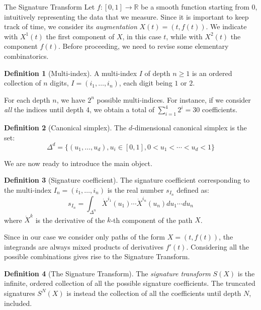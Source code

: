 \documentclass[twocolumn,9pt]{article}
\theoremstyle{definition}
\newtheorem{definition}{Definition}[section]
\theoremstyle{remark}
\begin{document}
\begin{section}{The Signature Transform}
Let $f: [0, 1] \to \mathbb{R}$ be a smooth function starting from $0$,
intuitively representing the data that we measure.
Since it is important to keep track of time, we consider its
\emph{augmentation} $X(t) = (t, f(t))$.
We indicate with $X^1(t)$ the first component of $X$, in this case
$t$, while with $X^2(t)$ the component $f(t)$.
Before proceeding, we need to revise some elementary combinatorics.

\begin{definition}[Multi-index]
A multi-index $I$ of depth $n \geq 1$ is an ordered collection of $n$ digits,
$I = (i_1, \dots, i_n)$, each digit being $1$ or $2$.
\end{definition}
For each depth $n$, we have $2^n$ possible multi-indices.
For instance, if we consider \emph{all} the indices until depth 4,
we obtain a total of $\sum_{i=1}^4 2^i = 30$ coefficients.

\begin{definition}[Canonical simplex]
The $d$-dimensional canonical simplex is the set:
\begin{equation*}
\Delta^d = \{ (u_1, \dots, u_d), u_i \in [0,1] ,
            0 < u_1 < \cdots < u_d < 1 \}
\end{equation*}
\end{definition}

We are now ready to introduce the main object.
\begin{definition}[Signature coefficient]
The signature coefficient corresponding to the multi-index
$I_n = (i_1, \dots, i_n)$
is the real number $s_{I_n}$ defined as:
\begin{equation}
s_{I_n} = \int_{\Delta^n} \dot{X}^{i_1}(u_1) \cdots
                            \dot{X}^{i_n}(u_n) du_1 \cdots du_n
\end{equation}
where $\dot{X}^k$ is the derivative of the $k$-th component of the path $X$.
\end{definition}

Since in our case we consider only paths of the form
$X = (t, f(t))$, the integrands are always mixed products of derivatives
$f'(t)$. Considering all the possible combinations gives rise to the Signature
Transform.

\begin{definition}[The Signature Transform]
The \emph{signature transform} $S(X)$ is the infinite, 
ordered collection of all the possible
signature coefficients. The truncated
signatures $S^N(X)$ is instead the collection of all the
coefficients until depth $N$, included.
\end{definition}



\end{section}
\end{document}
